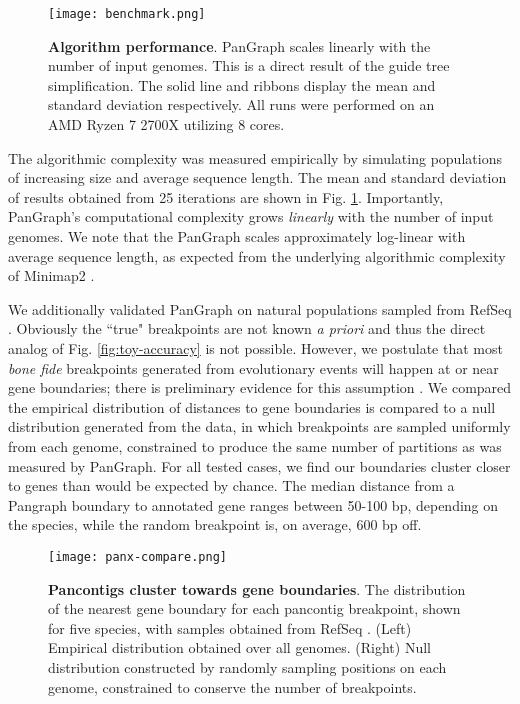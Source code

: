 \documentclass[aps,rmp,reprint,superscriptaddress,notitlepage,10pt]{revtex4-1}
\begin{document}
\begin{figure}[htb]
    \texttt{[image: benchmark.png]}
    \caption{{\bf Algorithm performance}.
        PanGraph scales linearly with the number of input genomes.
        This is a direct result of the guide tree simplification.
        The solid line and ribbons display the mean and standard deviation respectively.
        All runs were performed on an AMD Ryzen 7 2700X utilizing 8 cores.
    }
    \label{fig:toy-performance}
\end{figure}

The algorithmic complexity was measured empirically by simulating populations of increasing size and average sequence length.
The mean and standard deviation of results obtained from 25 iterations are shown in Fig. \ref{fig:toy-performance}.
Importantly, PanGraph's computational complexity grows \emph{linearly} with the number of input genomes.
We note that the PanGraph scales approximately log-linear with average sequence length, as expected from the underlying algorithmic complexity of Minimap2 \cite{li2018minimap2}.

We additionally validated PanGraph on natural populations sampled from RefSeq \cite{o2016reference}.
Obviously the ``true" breakpoints are not known \emph{a priori} and thus the direct analog of Fig. \ref{fig:toy-accuracy} is not possible.
However, we postulate that most \emph{bone fide} breakpoints generated from evolutionary events will happen at or near gene boundaries; there is preliminary evidence for this assumption \cite{oliveira2017chromosomal}.
We compared the empirical distribution of distances to gene boundaries is compared to a null distribution generated from the data, in which breakpoints are sampled uniformly from each genome, constrained to produce the same number of partitions as was measured by PanGraph.
For all tested cases, we find our boundaries cluster closer to genes than would be expected by chance.
The median distance from a Pangraph boundary to annotated gene ranges between 50-100 bp, depending on the species, while the random breakpoint is, on average, 600 bp off.

\begin{figure}[htb]
    \texttt{[image: panx-compare.png]}
    \caption{{\bf Pancontigs cluster towards gene boundaries}.
    The distribution of the nearest gene boundary for each pancontig breakpoint, shown for five species, with samples obtained from RefSeq \cite{o2016reference}.
    (Left) Empirical distribution obtained over all genomes.
    (Right) Null distribution constructed by randomly sampling positions on each genome, constrained to conserve the number of breakpoints.
    }
    \label{fig:panx-accuracy}
\end{figure}
\end{document}

